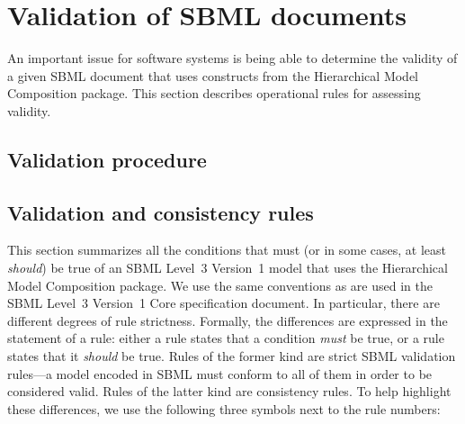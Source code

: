 
\section{Validation of SBML documents}
\label{apdx-validation}

An important issue for software systems is being able to determine the
validity of a given SBML document that uses constructs from the
Hierarchical Model Composition package.  This section describes
operational rules for assessing validity.  


\subsection{Validation procedure}
\label{validation-procedure}


\subsection{Validation and consistency rules}
\label{validation-rules}

This section summarizes all the conditions that must (or in some cases,
at least \emph{should}) be true of an SBML Level~3 Version~1 model that
uses the Hierarchical Model Composition package.  We use the same
conventions as are used in the SBML Level~3 Version~1 Core specification
document.  In particular, there are different degrees of rule
strictness.  Formally, the differences are expressed in the statement of
a rule: either a rule states that a condition \emph{must} be true, or a
rule states that it \emph{should} be true.  Rules of the former kind are
strict SBML validation rules---a model encoded in SBML must conform to
all of them in order to be considered valid.  Rules of the latter kind
are consistency rules.  To help highlight these differences, we use the
following three symbols next to the rule numbers:

